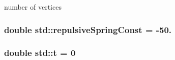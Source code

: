 number of vertices 

\hypertarget{namespacestd_a3901183639dea11eb8cf94025f5cfea8}{}
\subsubsection[{repulsive\+Spring\+Const}]{\setlength{\rightskip}{0pt plus 5cm}double std\+::repulsive\+Spring\+Const = -\/50.}\label{namespacestd_a3901183639dea11eb8cf94025f5cfea8}
\hypertarget{namespacestd_a3546d111a95e4b56d5e75a7ec695a2ee}{}
\subsubsection[{t}]{\setlength{\rightskip}{0pt plus 5cm}double std\+::t = 0}\label{namespacestd_a3546d111a95e4b56d5e75a7ec695a2ee}
